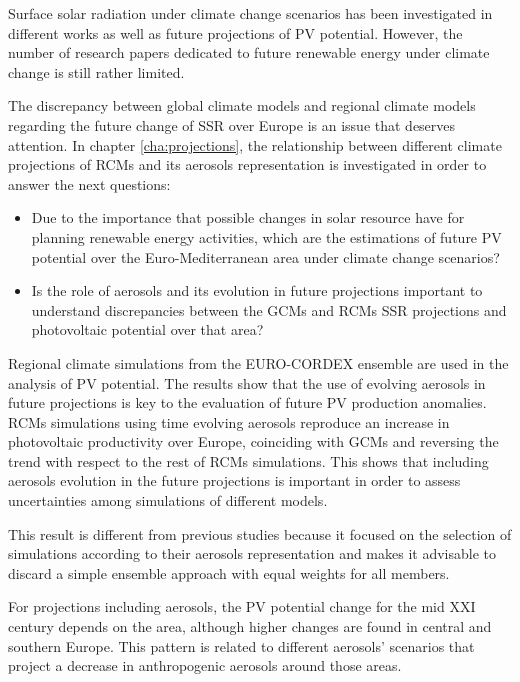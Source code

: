 Surface solar radiation under climate change scenarios has been investigated in different works as well as future projections of PV potential. However, the number of research papers dedicated to future renewable energy under climate change is still rather limited.

The discrepancy between global climate models and regional climate models regarding the future change of SSR over Europe is an issue that deserves attention. In chapter \ref{cha:projections}, the relationship between different climate projections of RCMs and its aerosols representation is investigated in order to answer the next questions:

\begin{itemize}
\item Due to the importance that possible changes in solar resource have for planning renewable energy activities, which are the estimations of future PV potential over the Euro-Mediterranean area under climate change scenarios?
\item Is the role of aerosols and its evolution in future projections important to understand discrepancies between the GCMs and RCMs SSR projections and photovoltaic potential over that area?

\end{itemize}

  Regional climate simulations from the EURO-CORDEX ensemble are used in the analysis of PV potential. The results show that the use of evolving aerosols in future projections is key to the evaluation of future PV production anomalies. RCMs simulations using time evolving aerosols reproduce an increase in photovoltaic productivity over Europe, coinciding with GCMs and reversing the trend with respect to the rest of RCMs simulations. This shows that including aerosols evolution in the future projections is important in order to assess uncertainties among simulations of different models. 

  This result is different from previous studies because it focused on the selection of simulations according to their aerosols representation and makes it advisable to discard a simple ensemble approach with equal weights for all members.
  
  For projections including aerosols, the PV potential change for the mid XXI century depends on the area, although higher changes are found in central and southern Europe. This pattern is related to different aerosols' scenarios that project a decrease in anthropogenic aerosols around those areas.


